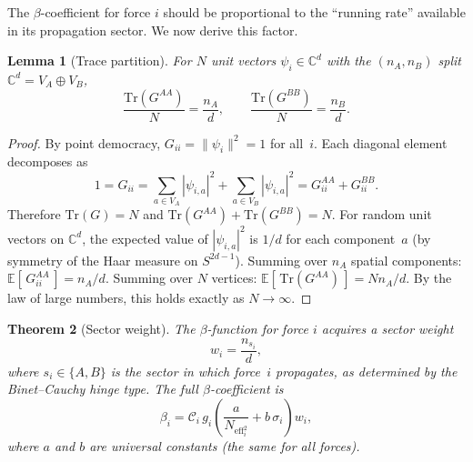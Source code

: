 \documentclass[12pt]{article}
\newtheorem{theorem}{Theorem}[section]
\newtheorem{lemma}[theorem]{Lemma}
\theoremstyle{definition}
\theoremstyle{remark}
\newcommand{\CC}{\mathbb{C}}
\newcommand{\Neff}{N_{\mathrm{eff}}}
\newcommand{\Tr}{\mathrm{Tr}}
\begin{document}
The $\beta$-coefficient for force $i$ should be proportional
to the ``running rate'' available in its propagation sector.
We now derive this factor.

\begin{lemma}[Trace partition]
\label{lem:trace}
For $N$ unit vectors $\psi_i \in \CC^d$ with the $(n_A, n_B)$
split $\CC^d = V_A \oplus V_B$,
\begin{equation}
  \frac{\Tr(G^{AA})}{N} = \frac{n_A}{d}, \qquad
  \frac{\Tr(G^{BB})}{N} = \frac{n_B}{d}.
  \label{eq:trace}
\end{equation}
\end{lemma}

\begin{proof}
By point democracy, $G_{ii} = \|\psi_i\|^2 = 1$ for all~$i$.
Each diagonal element decomposes as
\begin{equation}
  1 = G_{ii} = \sum_{a \in V_A} |\psi_{i,a}|^2
    + \sum_{a \in V_B} |\psi_{i,a}|^2
  = G^{AA}_{ii} + G^{BB}_{ii}.
\end{equation}
Therefore $\Tr(G) = N$ and
$\Tr(G^{AA}) + \Tr(G^{BB}) = N$.
For random unit vectors on $\CC^d$,
the expected value of $|\psi_{i,a}|^2$ is $1/d$
for each component~$a$ (by symmetry of the Haar measure
on $S^{2d-1}$).
Summing over $n_A$ spatial components:
$\mathbb{E}[\,G^{AA}_{ii}\,] = n_A/d$.
Summing over $N$ vertices:
$\mathbb{E}[\,\Tr(G^{AA})\,] = N n_A/d$.
By the law of large numbers, this holds exactly
as $N \to \infty$.
\end{proof}

\begin{theorem}[Sector weight]
\label{thm:weight}
The $\beta$-function for force $i$ acquires a sector weight
\begin{equation}
  w_i = \frac{n_{s_i}}{d},
  \label{eq:weight}
\end{equation}
where $s_i \in \{A, B\}$ is the sector in which force~$i$
propagates, as determined by the Binet--Cauchy hinge type.
The full $\beta$-coefficient is
\begin{equation}
  \beta_i = \mathcal{C}_i \, g_i
  \left(\frac{a}{\Neff_i^2} + b\,\sigma_i\right) w_i,
  \label{eq:beta}
\end{equation}
where $a$ and $b$ are universal constants
(the same for all forces).
\end{theorem}
\end{document}
